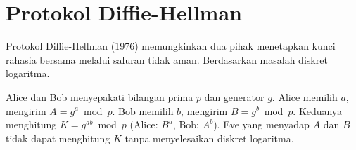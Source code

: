 \section{Protokol Diffie-Hellman}

Protokol Diffie-Hellman (1976) memungkinkan dua pihak menetapkan kunci rahasia bersama melalui saluran tidak aman. Berdasarkan masalah diskret logaritma.

Alice dan Bob menyepakati bilangan prima $p$ dan generator $g$. Alice memilih $a$, mengirim $A = g^a \bmod p$. Bob memilih $b$, mengirim $B = g^b \bmod p$. Keduanya menghitung $K = g^{ab} \bmod p$ (Alice: $B^a$, Bob: $A^b$). Eve yang menyadap $A$ dan $B$ tidak dapat menghitung $K$ tanpa menyelesaikan diskret logaritma.
